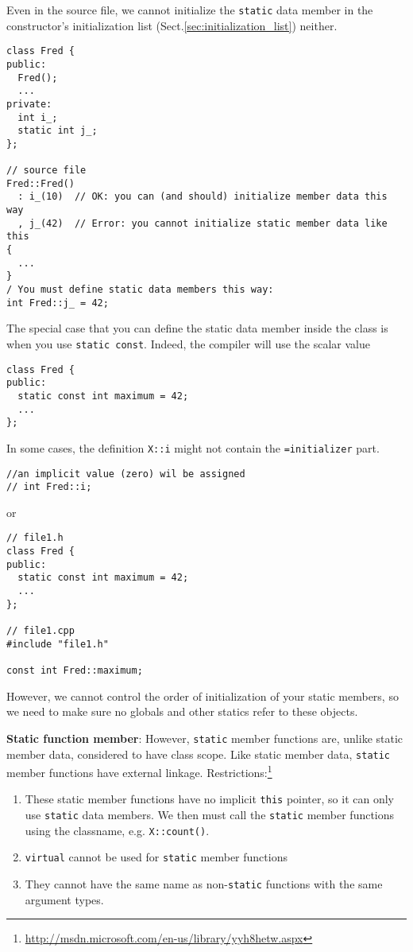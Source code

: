 Even in the source file, we cannot initialize the \verb!static! data member in
the constructor's initialization list
(Sect.\ref{sec:initialization_list}) neither.
\begin{verbatim}
class Fred {
public:
  Fred();
  ...
private:
  int i_;
  static int j_;
};

// source file
Fred::Fred()
  : i_(10)  // OK: you can (and should) initialize member data this way
  , j_(42)  // Error: you cannot initialize static member data like this
{
  ...
}
/ You must define static data members this way:
int Fred::j_ = 42;
\end{verbatim}

The special case that you can define the static data member inside the class is
when you use \verb!static const!. Indeed, the compiler will use the scalar value
\begin{verbatim}
class Fred {
public:
  static const int maximum = 42;
  ...
};
\end{verbatim}

In some cases, the definition \verb!X::i! might not contain the
\verb!=initializer! part.
\begin{verbatim}
//an implicit value (zero) wil be assigned
// int Fred::i;
\end{verbatim}
or
\begin{verbatim}
// file1.h
class Fred {
public:
  static const int maximum = 42;
  ...
};

// file1.cpp
#include "file1.h"

const int Fred::maximum;
\end{verbatim}

However, we cannot control the order of initialization of your static members,
so we need to make sure no globals and other statics refer to these objects.

{\bf Static function member}: However, \verb!static! member functions are,
unlike static member data, considered to have class scope. Like static member
data, \verb!static! member functions have external linkage.
Restrictions:\footnote{\url{http://msdn.microsoft.com/en-us/library/yyh8hetw.aspx}}
\begin{enumerate}
  \item These static member functions
have no implicit \verb!this! pointer, so it can only use \verb!static! data
members. We then must call the \verb!static! member functions using the
classname, e.g. \verb!X::count()!.
  \item \verb!virtual! cannot be used for \verb!static! member functions
  \item They cannot have the same name as non-\verb!static! functions with the
  same argument types.
\end{enumerate}

